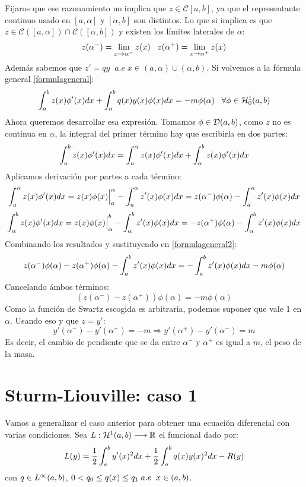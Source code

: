 Fijaros que ese razonamiento no implica que $z\in\mathcal{C}[a,b]$, ya que el representante continuo usado en $[a,\alpha]$ y $[\alpha,b]$ son distintos. Lo que si implica es que $z\in\mathcal{C}\left([a,\alpha]\right)\cap \mathcal{C}\left([\alpha,b]\right)$ y existen los límites laterales de $\alpha$:
\[
z(\alpha^-)=\displaystyle\lim_{ x \to \alpha^- } z(x) \;\;\; z(\alpha^+)=\displaystyle\lim_{ x \to \alpha^+ } z(x)
\]
Además sabemos que $z'=qy \;\; a.e \; x \in(a,\alpha)\cup(\alpha,b)$. Si volvemos a la fórmula general \eqref{formulageneral}:
\begin{equation}
\label{formulageneral2}
\displaystyle\int_{ a }^{ b } z(x)\phi'(x)dx+\displaystyle\int_{ a }^{ b } q(x)y(x)\phi(x)dx=-m\phi(\alpha) \;\;\; \forall\phi\in\mathcal{H}_0^{ 1 } (a,b)
\end{equation}
Ahora queremos desarrollar esa expresión. Tomamos $\phi\in\mathcal{D}(a,b)$, como $z$ no es continua en $\alpha$, la integral del primer término hay que escribirla en dos partes:
\[
\displaystyle\int_{ a }^{ b } z(x)\phi'(x)dx=\displaystyle\int_{ a }^{ \alpha } z(x)\phi'(x)dx+\displaystyle\int_{ \alpha }^{ b } z(x)\phi'(x)dx
\]
Aplicamos derivación por partes a cada término:
\[
\displaystyle\int_{ a }^{ \alpha } z(x)\phi'(x)dx=z(x)\phi(x)\Big|_a^\alpha-\displaystyle\int_{ a }^{ \alpha } z'(x)\phi(x)dx=z(\alpha^-)\phi(\alpha)-\displaystyle\int_{ a }^{ \alpha } z'(x)\phi(x)dx
\]
\[
\displaystyle\int_{ \alpha }^{ b } z(x)\phi'(x)dx=z(x)\phi(x)\Big|_\alpha^b-\displaystyle\int_{ \alpha }^{ b } z'(x)\phi(x)dx=-z(\alpha^+)\phi(\alpha)-\displaystyle\int_{ \alpha }^{ b } z'(x)\phi(x)dx
\]
Combinando los resultados y sustituyendo en \eqref{formulageneral2}:
\[
z(\alpha^-)\phi(\alpha)-z(\alpha^+)\phi(\alpha)-\displaystyle\int_{ a }^{ b } z'(x)\phi(x)dx=-\displaystyle\int_{ a }^{ b } z'(x)\phi(x)dx-m\phi(\alpha)
\]
Cancelando ámbos términos:
\[
\left(z(\alpha^-)-z(\alpha^+)\right)\phi(\alpha)=-m\phi(\alpha)
\]
Como la función de Swartz escogida es arbitraria, podemos suponer que vale 1 en $\alpha$. Usando eso y que $z=y'$:
\[
y'(\alpha^-)-y'(\alpha^+)=-m \Rightarrow y'(\alpha^+)-y'(\alpha^-)=m  
\]
Es decir, el cambio de pendiente que se da entre $\alpha^-$ y $\alpha^+$ es igual a $m$, el peso de la masa.

\section{Sturm-Liouville: caso 1}

Vamos a generalizar el caso anterior para obtener una ecuación diferencial con varias condiciones. Sea $L : \mathcal{H}^{ 1 } (a,b) \longrightarrow \mathbb{R}$ el funcional dado por:
\[
L(y)=\frac{1}{2}\displaystyle\int_{ a }^{ b } y'(x)^2dx+\frac{1}{2}\displaystyle\int_{ a }^{ b } q(x)y(x)^2dx-R(y)
\]
con $q\in L^{ \infty }(a,b)$, $0<q_0\leq q(x)\leq q_1 \; a.e \;\; x\in(a,b)$. 


